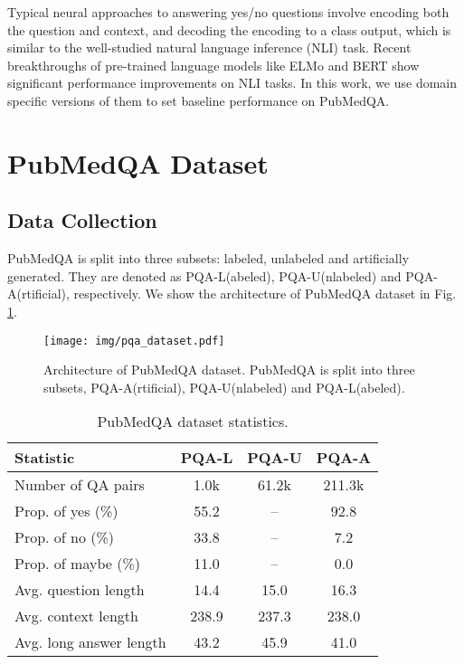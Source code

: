 \documentclass[11pt,a4paper]{article}
\begin{document}
Typical neural approaches to answering yes/no questions involve encoding both the question and context, and decoding the encoding to a class output, which is similar to the well-studied natural language inference (NLI) task. Recent breakthroughs of pre-trained language models like ELMo \cite{peters2018deep} and BERT \cite{devlin2018bert} show significant performance improvements on NLI tasks. In this work, we use domain specific versions of them to set baseline performance on PubMedQA. 

\section{PubMedQA Dataset}
\subsection{Data Collection}
PubMedQA is split into three subsets: labeled, unlabeled and artificially generated. They are denoted as PQA-L(abeled), PQA-U(nlabeled) and PQA-A(rtificial), respectively. We show the architecture of PubMedQA dataset in Fig. \ref{fig:dataset}.
\begin{figure}
    \centering
    \texttt{[image: img/pqa\_dataset.pdf]}
    \vskip -0.15cm
    \caption{Architecture of PubMedQA dataset. PubMedQA is split into three subsets, PQA-A(rtificial), PQA-U(nlabeled) and PQA-L(abeled).}
    \label{fig:dataset}
    \vspace{-0.5em}
\end{figure}

\begin{table}[htbp]
\centering
\small
\begin{tabular}{lccc}
\toprule
\textbf{Statistic} & \textbf{PQA-L} & \textbf{PQA-U} & \textbf{PQA-A}\\
\midrule
Number of QA pairs & 1.0k & 61.2k & 211.3k\\
\midrule
Prop. of yes (\%) & 55.2 & -- & 92.8 \\
Prop. of no  (\%) & 33.8 & -- & 7.2 \\
Prop. of maybe (\%) & 11.0 & -- & 0.0 \\
\midrule
Avg. question length & 14.4 & 15.0 & 16.3 \\
Avg. context length & 238.9 & 237.3 & 238.0 \\
Avg. long answer length & 43.2 & 45.9 & 41.0 \\
\bottomrule
\end{tabular}
\vskip -0.15cm
\caption{PubMedQA dataset statistics.}
\vspace{-0.5em}
\label{tab:stat}
\end{table}
\end{document}
